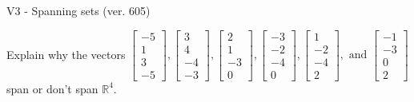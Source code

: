 \begin{exercise}
  \begin{exerciseTitle}V3 - Spanning sets (ver. 605)\end{exerciseTitle}
  \begin{exerciseStatement}
    Explain why the vectors \(\left[\begin{array}{r}
-5 \\
1 \\
3 \\
-5
\end{array}\right] , \left[\begin{array}{r}
3 \\
4 \\
-4 \\
-3
\end{array}\right] , \left[\begin{array}{r}
2 \\
1 \\
-3 \\
0
\end{array}\right] , \left[\begin{array}{r}
-3 \\
-2 \\
-4 \\
0
\end{array}\right] , \left[\begin{array}{r}
1 \\
-2 \\
-4 \\
2
\end{array}\right] , \text{ and } \left[\begin{array}{r}
-1 \\
-3 \\
0 \\
2
\end{array}\right]\) span or don't span \(\mathbb{R}^4\). 
	



\end{exerciseStatement}
\end{exercise}
